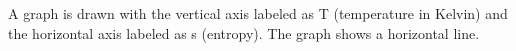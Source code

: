 A graph is drawn with the vertical axis labeled as T (temperature in Kelvin) and the horizontal axis labeled as s (entropy). The graph shows a horizontal line.